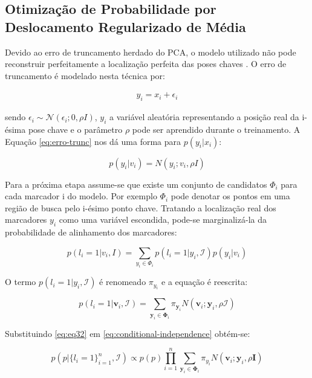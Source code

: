 {\subsection{Otimização de Probabilidade por Deslocamento Regularizado de Média}

Devido ao erro de truncamento herdado do PCA, o modelo utilizado não pode reconstruir perfeitamente a localização perfeita das poses chaves \cite{saragih2011deformable}. O erro de truncamento é modelado nesta técnica por:

\begin{align}
y_i = x_i + \epsilon_i
\label{eq:erro-trunc}
\end{align}

sendo $\epsilon_i \sim \mathcal{N}(\epsilon_i; 0, \rho I)$, $y_i$ a variável aleatória representando a posição real da i-ésima pose chave e o parâmetro $\rho$ pode ser aprendido durante o treinamento. A Equação \ref{eq:erro-trunc} nos dá uma forma para $p(y_i | x_i)$:

\begin{equation}
p(y_i | v_i) = N(y_i; v_i, \rho I)
\end{equation}

Para a próxima etapa assume-se que existe um conjunto de candidatos $\Phi_i$ para cada marcador i do modelo. Por exemplo $\Phi_i$ pode denotar os pontos em uma região de busca pelo i-ésimo ponto chave. Tratando a localização real dos marcadores $y_i$ como uma variável escondida, pode-se marginalizá-la da probabilidade de alinhamento dos marcadores:

\begin{equation}
p(l_i = 1|v_i, I) = \sum_{y_i \in \Phi_i} p(l_i = 1| y_i, \mathcal{I})p(y_i|v_i)
\end{equation}

O termo $p(l_i = 1| y_i, \mathcal{I})$ é renomeado $\pi_{y_i}$ e a equação é reescrita:

\begin{equation}
\label{eq:eq32}
p(l_i = 1|\mathbf{v}_i, \mathcal{I}) = \sum_{\mathbf{y}_i \in \mathbf{\Phi}_i} \pi_{\mathbf{y}_i} N(\mathbf{v}_i; \mathbf{y}_i, \rho \mathcal{I})
\end{equation}

Substituindo \ref{eq:eq32} em \ref{eq:conditional-independence}
 obtém-se:

\begin{equation}
p(p|\{l_i=1\}_{i=1}^n, \mathcal{I}) \varpropto p(p) \prod_{i=1}^n \sum_{\mathbf{y}_i \in \mathbf{\Phi}_i}
\pi_{y_i} N(\mathbf{v}_i; \mathbf{y}_i, \rho \mathbf{I})
\label{eq:eq23}
\end{equation}

}
